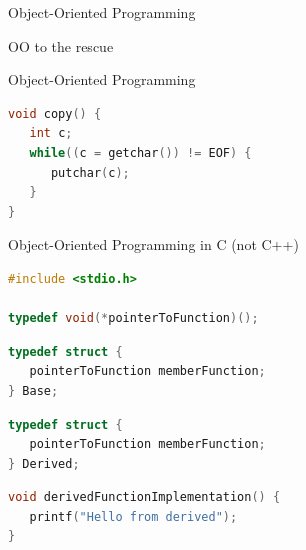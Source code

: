 
\begin{frame}{Object-Oriented Programming}
\begin{center}
OO to the rescue
\end{center}
\end{frame}

\begin{frame}[fragile]{Object-Oriented Programming}
\begin{lstlisting}[language=c]
void copy() {
   int c;
   while((c = getchar()) != EOF) {
      putchar(c);
   }
}
\end{lstlisting}
\end{frame}


\begin{frame}[fragile]{Object-Oriented Programming in C (not C++)}
\begin{lstlisting}[language=c]
#include <stdio.h>

typedef void(*pointerToFunction)();
\end{lstlisting}
\pause
\begin{lstlisting}[language=c]
typedef struct {
   pointerToFunction memberFunction;
} Base;
\end{lstlisting}
\pause
\begin{lstlisting}[language=c]
typedef struct {
   pointerToFunction memberFunction;
} Derived;
\end{lstlisting}
\pause
\begin{lstlisting}[language=c]
void derivedFunctionImplementation() {
   printf("Hello from derived");
}
\end{lstlisting}
\end{frame}

